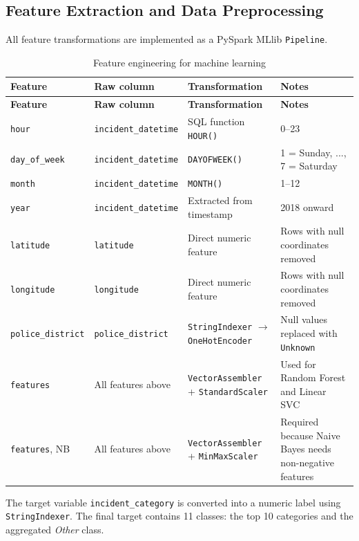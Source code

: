 \documentclass[12pt,a4paper]{article}
\begin{document}
\subsection{Feature Extraction and Data Preprocessing}

All feature transformations are implemented as a PySpark MLlib \texttt{Pipeline}.

\begin{longtable}{L{3.5cm} L{4cm} L{5cm} L{3cm}}
\caption{Feature engineering for machine learning}\\
\toprule
\textbf{Feature} & \textbf{Raw column} & \textbf{Transformation} & \textbf{Notes} \\
\midrule
\endfirsthead
\toprule
\textbf{Feature} & \textbf{Raw column} & \textbf{Transformation} & \textbf{Notes} \\
\midrule
\endhead
\texttt{hour} & \texttt{incident\_datetime} & SQL function \texttt{HOUR()} & 0--23 \\
\texttt{day\_of\_week} & \texttt{incident\_datetime} & \texttt{DAYOFWEEK()} & 1 = Sunday, ..., 7 = Saturday \\
\texttt{month} & \texttt{incident\_datetime} & \texttt{MONTH()} & 1--12 \\
\texttt{year} & \texttt{incident\_datetime} & Extracted from timestamp & 2018 onward \\
\texttt{latitude} & \texttt{latitude} & Direct numeric feature & Rows with null coordinates removed \\
\texttt{longitude} & \texttt{longitude} & Direct numeric feature & Rows with null coordinates removed \\
\texttt{police\_district} & \texttt{police\_district} & \texttt{StringIndexer} $\rightarrow$ \texttt{OneHotEncoder} & Null values replaced with \texttt{Unknown} \\
\texttt{features} & All features above & \texttt{VectorAssembler} + \texttt{StandardScaler} & Used for Random Forest and Linear SVC \\
\texttt{features}, NB & All features above & \texttt{VectorAssembler} + \texttt{MinMaxScaler} & Required because Naive Bayes needs non-negative features \\
\bottomrule
\end{longtable}

The target variable \texttt{incident\_category} is converted into a numeric label using \texttt{StringIndexer}. The final target contains 11 classes: the top 10 categories and the aggregated \textit{Other} class.
\end{document}
